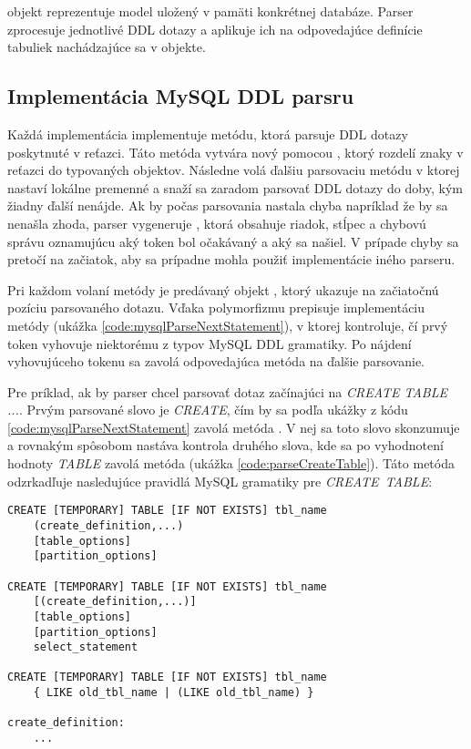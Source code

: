  objekt reprezentuje model uložený v pamäti konkrétnej databáze. Parser zprocesuje jednotlivé DDL dotazy a aplikuje ich na odpovedajúce definície tabuliek nachádzajúce sa v  objekte.

\subsection{Implementácia MySQL DDL parsru}
Každá implementácia  implementuje metódu, ktorá parsuje DDL dotazy poskytnuté v reťazci. Táto metóda vytvára nový  pomocou , ktorý rozdelí znaky v reťazci do typovaných  objektov. Následne volá ďalšiu parsovaciu metódu v ktorej nastaví lokálne premenné a snaží sa zaradom parsovať DDL dotazy do doby, kým žiadny ďalší nenájde. Ak by počas parsovania nastala chyba napríklad že by sa nenašla zhoda, parser vygeneruje , ktorá obsahuje riadok, stĺpec a chybovú správu oznamujúcu aký token bol očakávaný a aký sa našiel. V prípade chyby sa  pretočí na začiatok, aby sa prípadne mohla použiť implementácie iného parseru.

Pri každom volaní metódy  je predávaný objekt , ktorý ukazuje na začiatočnú pozíciu parsovaného dotazu. Vďaka polymorfizmu  prepisuje implementáciu  metódy (ukážka \ref{code:mysqlParseNextStatement}), v ktorej kontroluje, čí prvý token vyhovuje niektorému z typov MySQL DDL gramatiky. Po nájdení vyhovujúceho tokenu sa zavolá odpovedajúca metóda na ďalšie parsovanie. 

Pre príklad, ak by parser chcel parsovať dotaz začínajúci na \textit{CREATE TABLE ...}. Prvým parsované slovo je \textit{CREATE}, čím by sa podľa ukážky z kódu \ref{code:mysqlParseNextStatement} zavolá metóda . V nej sa toto slovo skonzumuje a rovnakým spôsobom nastáva kontrola druhého slova, kde sa po vyhodnotení hodnoty \textit{TABLE} zavolá metóda  (ukážka \ref{code:parseCreateTable}). Táto metóda odzrkadľuje nasledujúce pravidlá MySQL gramatiky pre \mbox{\textit{CREATE TABLE}}:
\newline
\begin{lstlisting}[language=MySQL, frame=none, numbers=none]
CREATE [TEMPORARY] TABLE [IF NOT EXISTS] tbl_name
    (create_definition,...)
    [table_options]
    [partition_options]

CREATE [TEMPORARY] TABLE [IF NOT EXISTS] tbl_name
    [(create_definition,...)]
    [table_options]
    [partition_options]
    select_statement

CREATE [TEMPORARY] TABLE [IF NOT EXISTS] tbl_name
    { LIKE old_tbl_name | (LIKE old_tbl_name) }

create_definition:
    ...
\end{lstlisting}

